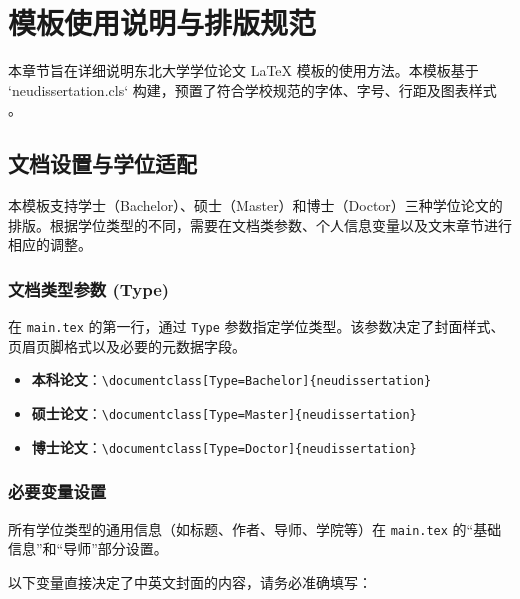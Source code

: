 \chapter{模板使用说明与排版规范}

本章节旨在详细说明东北大学学位论文 LaTeX 模板的使用方法。本模板基于 `neudissertation.cls` 构建，预置了符合学校规范的字体、字号、行距及图表样式 。

\section{文档设置与学位适配}

本模板支持学士（Bachelor）、硕士（Master）和博士（Doctor）三种学位论文的排版。根据学位类型的不同，需要在文档类参数、个人信息变量以及文末章节进行相应的调整。

\subsection{文档类型参数 (Type)}

在 \texttt{main.tex} 的第一行，通过 \texttt{Type} 参数指定学位类型。该参数决定了封面样式、页眉页脚格式以及必要的元数据字段。

\begin{itemize}
    \item \textbf{本科论文}：\verb|\documentclass[Type=Bachelor]{neudissertation}|
    \item \textbf{硕士论文}：\verb|\documentclass[Type=Master]{neudissertation}|
    \item \textbf{博士论文}：\verb|\documentclass[Type=Doctor]{neudissertation}|
\end{itemize}

\subsection{必要变量设置}

所有学位类型的通用信息（如标题、作者、导师、学院等）在 \texttt{main.tex} 的“基础信息”和“导师”部分设置。

以下变量直接决定了中英文封面的内容，请务必准确填写：

